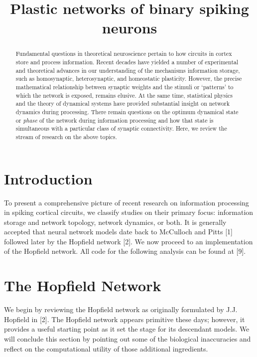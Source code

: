 \documentclass{article} %
\title{Plastic networks of binary spiking neurons}
\begin{document}
\maketitle

\begin{abstract}

Fundamental questions in theoretical neuroscience pertain to how circuits in cortex store and process information. Recent decades have yielded a number of experimental and theoretical advances in our understanding of the mechanisms information storage, such as homosynaptic, heterosynaptic, and homeostatic plasticity. However, the precise mathematical relationship between synaptic weights and the stimuli or `patterns' to which the network is exposed, remains elusive. At the same time, statistical physics and the theory of dynamical systems have provided substantial insight on network dynamics during processing. There remain questions on the optimum dynamical state or \emph{phase} of the network during information processing and how that state is simultaneous with a particular class of synaptic connectivity. Here, we review the stream of research on the above topics.


\end{abstract}


\section{Introduction}

To present a comprehensive picture of recent research on information processing in spiking cortical circuits, we classify studies on their primary focus: information storage and network topology, network dynamics, or both. It is generally accepted that neural network models date back to McCulloch and Pitts [1] followed later by the Hopfield network [2]. We now proceed to an implementation of the Hopfield network. All code for the following analysis can be found at [9].  

\section{The Hopfield Network}

We begin by reviewing the Hopfield network as originally formulated by J.J. Hopfield in [2]. The Hopfield network appears primitive these days; however, it provides a useful starting point as it set the stage for its descendant models. We will conclude this section by pointing out some of the biological inaccuracies and reflect on the computational utility of those additional ingredients.
\end{document}
